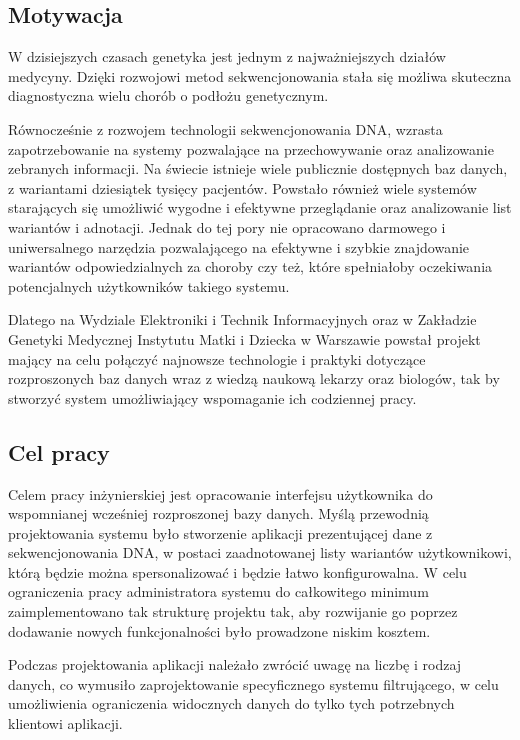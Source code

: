 \documentclass[a4paper,12pt,twoside]{article}
\begin{document}
\subsection{Motywacja}


W dzisiejszych czasach genetyka jest jednym z najważniejszych działów medycyny.
Dzięki rozwojowi metod sekwencjonowania stała się możliwa skuteczna diagnostyczna wielu chorób o podłożu genetycznym.

Równocześnie z rozwojem technologii sekwencjonowania DNA, wzrasta zapotrzebowanie
na systemy pozwalające na przechowywanie oraz analizowanie zebranych
informacji.
Na świecie istnieje wiele publicznie dostępnych baz danych,
z wariantami dziesiątek tysięcy pacjentów. Powstało również
wiele systemów starających się umożliwić wygodne i efektywne
przeglądanie oraz analizowanie list wariantów i adnotacji.
Jednak do tej pory nie opracowano darmowego i uniwersalnego narzędzia pozwalającego
na efektywne i szybkie znajdowanie
wariantów odpowiedzialnych za choroby czy też, które spełniałoby oczekiwania potencjalnych użytkowników takiego systemu.

Dlatego na Wydziale Elektroniki i Technik Informacyjnych
oraz w Zakładzie Genetyki Medycznej Instytutu Matki i Dziecka w Warszawie
powstał projekt mający na celu połączyć najnowsze technologie i
praktyki dotyczące rozproszonych baz danych wraz z wiedzą naukową
lekarzy oraz biologów, tak by stworzyć system umożliwiający
wspomaganie ich codziennej pracy.
  
\subsection{Cel pracy} 

Celem pracy inżynierskiej jest opracowanie
interfejsu użytkownika do wspomnianej wcześniej
rozproszonej bazy danych.
Myślą przewodnią projektowania systemu było stworzenie aplikacji
prezentującej dane z sekwencjonowania DNA,
w postaci zaadnotowanej listy wariantów użytkownikowi, którą będzie
można spersonalizować i będzie łatwo konfigurowalna.
W celu ograniczenia pracy administratora systemu do
całkowitego minimum zaimplementowano tak strukturę projektu
tak, aby rozwijanie go poprzez dodawanie nowych funkcjonalności było
prowadzone niskim kosztem.

Podczas projektowania aplikacji należało zwrócić uwagę na
liczbę i rodzaj danych, co wymusiło zaprojektowanie specyficznego systemu
filtrującego, w celu umożliwienia ograniczenia widocznych danych
do tylko tych potrzebnych klientowi aplikacji.
\end{document}

